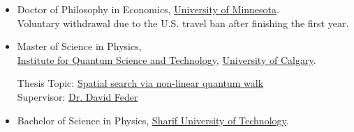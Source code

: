 \documentclass[10pt]{article}
\newenvironment{outerlist}[1][\enskip\textbullet]%
        {\begin{itemize}[#1,leftmargin=*]}{\end{itemize}%
         \vspace{-.6\baselineskip}}
\begin{document}
\begin{outerlist}
\item Doctor of Philosophy in Economics, \href{http://cla.umn.edu/economics}
              {University of Minnesota}.  \\
             Voluntary withdrawal due to the U.S. travel ban after finishing the first year.
%            
%       
%                       
             
\end{outerlist}
\begin{outerlist}
\item Master of Science in Physics, \hspace{2mm} \\ \href{http://www.iqst.ca/}{Institute for Quantum Science and Technology}, \href{http://www.ucalgary.ca/}{University of Calgary}.
           
         Thesis Topic: \href{http://theses.ucalgary.ca/handle/11023/542}
             {Spatial search via non-linear quantum walk}\\
         Supervisor:
              \href{http://www.iqst.ca/people/home/dfeder/index.php}
                  {Dr. David Feder}
       
\end{outerlist}


\begin{outerlist}
\item Bachelor of Science in Physics, 
             \href{http://www.sharif.ir/web/en/}{Sharif University of Technology}.
       
\end{outerlist}
\end{document}
